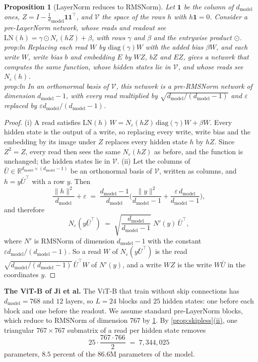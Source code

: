 \documentclass[10pt]{article}
\newtheorem{proposition}[theorem]{Proposition}
\theoremstyle{definition}
\theoremstyle{remark}
\newcommand{\R}{\mathbb{R}}
\newcommand{\dm}{d_{\mathrm{model}}}
\newcommand{\norm}[1]{\lVert #1\rVert}
\newcommand{\para}[1]{\smallskip\noindent\textbf{#1}\hspace{0.5em}}
\newcommand{\ptlabel}[1]{\phantomsection\label{#1}}
\DeclareRobustCommand{\cpref}[2]{\hyperref[#1:#2]{\cref*{#1}(#2)}}
\newcommand{\stpart}[3]{\ifx\relax#1\relax\else\ptlabel{#1:#2}\fi{\upshape\bfseries\boldmath(#2)\ifx\relax#3\relax\else\ #3.\fi}}
\begin{document}
\begin{proposition}[LayerNorm reduces to RMSNorm]\label{prop:ln}
Let $\mathbf 1$ be the column of $\dm$ ones, $Z = I - \tfrac1\dm\mathbf 1\mathbf 1^\top$, and $\mathcal V$ the space of the rows $h$ with $h\mathbf 1 = 0$. Consider a pre-LayerNorm network, whose reads and readout see $\mathrm{LN}(h) = \gamma\odot N_\varepsilon(hZ) + \beta$, with rows $\gamma$ and $\beta$ and the entrywise product $\odot$.\\
\stpart{prop:ln}{i}{} Replacing each read $W$ by $\mathrm{diag}(\gamma)W$ with the added bias $\beta W$, and each write $W$, write bias $b$ and embedding $E$ by $WZ$, $bZ$ and $EZ$, gives a network that computes the same function, whose hidden states lie in $\mathcal V$, and whose reads see $N_\varepsilon(h)$.\\
\stpart{prop:ln}{ii}{} In an orthonormal basis of $\mathcal V$, this network is a pre-RMSNorm network of dimension $\dm-1$, with every read multiplied by $\sqrt{\dm/(\dm-1)}$ and $\varepsilon$ replaced by $\varepsilon \dm/(\dm-1)$.
\end{proposition}

\begin{proof}
(i) A read satisfies $\mathrm{LN}(h)\,W = N_\varepsilon(hZ)\,\mathrm{diag}(\gamma)W + \beta W$. Every hidden state is the output of a write, so replacing every write, write bias and the embedding by its image under $Z$ replaces every hidden state $h$ by $hZ$. Since $Z^2 = Z$, every read then sees the same $N_\varepsilon(hZ)$ as before, and the function is unchanged; the hidden states lie in $\mathcal V$.
(ii) Let the columns of $\bar U \in \R^{\dm\times(\dm-1)}$ be an orthonormal basis of $\mathcal V$, written as columns, and $h = y\bar U^\top$ with a row $y$. Then
\[
\frac{\norm{h}^2}{\dm} + \varepsilon \;=\; \frac{\dm-1}{\dm}\Big(\frac{\norm{y}^2}{\dm-1} + \frac{\varepsilon\,\dm}{\dm-1}\Big),
\]
and therefore
\[
N_\varepsilon(y\bar U^\top) \;=\; \sqrt{\frac{\dm}{\dm-1}}\;N'(y)\,\bar U^\top ,
\]
where $N'$ is RMSNorm of dimension $\dm-1$ with the constant $\varepsilon \dm/(\dm-1)$. So a read $W$ of $N_\varepsilon(y\bar U^\top)$ is the read $\sqrt{\dm/(\dm-1)}\,\bar U^\top W$ of $N'(y)$, and a write $WZ$ is the write $W\bar U$ in the coordinates $y$.
\end{proof}

\para{The ViT-B of Ji et al.}\label{app:scale} The ViT-B that \citet{ji2026cutting} train without skip connections has $\dm = 768$ and $12$ layers, so $L = 24$ blocks and $25$ hidden states: one before each block and one before the readout. We assume standard pre-LayerNorm blocks, which reduce to RMSNorm of dimension $767$ by \cref{prop:ln}. By \cpref{prop:skipless}{ii}, one triangular $767\times767$ submatrix of a read per hidden state removes
\[
25\cdot\frac{767\cdot766}{2} \;=\; 7{,}344{,}025
\]
parameters, $8.5$ percent of the $86.6$M parameters of the model.
\end{document}
